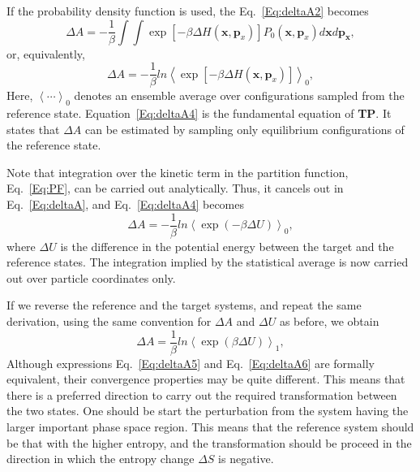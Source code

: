 If the probability density function is used, the Eq.~\ref{Eq:deltaA2}  becomes
\begin{equation}
\Delta A = -\frac{1}{\beta} \int\int \exp[-\beta \Delta H(\textbf{x},\textbf{p}_{x})] P_{0}(\textbf{x},\textbf{p}_{x}) d\textbf{x}d\textbf{p}_\textbf{x},
\label{Eq:deltaA3}
\end{equation}
or, equivalently,
\begin{equation}
\Delta A = -\frac{1}{\beta} ln \left \langle \exp[-\beta \Delta H(\textbf{x},\textbf{p}_{x})] \right \rangle  _{0},
\label{Eq:deltaA4}
\end{equation}
Here, $\left \langle \cdots \right \rangle _{0}$ denotes an ensemble average over configurations sampled from the reference state. Equation~\ref{Eq:deltaA4} is the fundamental equation of \textbf{TP}. It states that $\Delta A$ can be estimated by sampling only equilibrium configurations of the reference state.

Note that integration over the kinetic term in the partition function, Eq.~\ref{Eq:PF}, can be carried out analytically. Thus, it cancels out in Eq.~\ref{Eq:deltaA}, and Eq.~\ref{Eq:deltaA4} becomes
\begin{equation}
\Delta A = -\frac{1}{\beta} ln \left \langle \exp(-\beta \Delta U) \right \rangle  _{0},
\label{Eq:deltaA5}
\end{equation}
where $\Delta U$ is the difference in the potential energy between the target and the reference states. The integration implied by the statistical average is now carried out over particle coordinates only.

If we reverse the reference and the target systems, and repeat the same derivation, using the same convention for  $\Delta A$ and $\Delta U$ as before, we obtain
\begin{equation}
\Delta A = \frac{1}{\beta} ln \left \langle \exp(\beta \Delta U) \right \rangle  _{1},
\label{Eq:deltaA6}
\end{equation}
Although expressions Eq.~\ref{Eq:deltaA5} and Eq.~\ref{Eq:deltaA6} are formally equivalent, their convergence properties may be quite different. This means that there is a preferred direction to carry out the required transformation between the two states. One should be start the perturbation from the system having the larger important phase space region. This means that the reference system should be that with the higher entropy, and the transformation should be proceed in the direction in which the entropy change $\Delta S$ is negative. 

